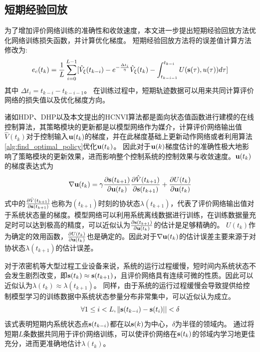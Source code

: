 \subsection{短期经验回放}
为了增加评价网络训练的准确性和收敛速度，本文进一步提出短期经验回放方法优化网络训练损失函数，并计算优化梯度。
短期经验回放方法将的误差值计算方法修改为:
\begin{equation}
  e_{c }(t_k)=\frac{1}{L}\sum_{i=0}^{L-1}[\hat{V}_{\xi}(t_{k-i})-e^{-\frac{\Delta t_i}{\eta}} \hat{V}_{\xi}(t_k)-\int_{t_{k-i-1}}^{t_{k-i}}U(\mathbf s(\tau), u(\tau))d \tau]
  \label{equ:TDerror_replay}
  \end{equation}
  其中 $\Delta t_i = t_{k-i}-t_{k-i-1}$。
在训练过程中，短期轨迹数据可以用来共同计算评价网络的损失值以及优化梯度方向。

诸如HDP、DHP以及本文提出的HCNVI算法都是面向状态值函数进行建模的在线控制算法，其策略模块的更新都是以模型网络作为媒介，计算评价网络输出值$\hat{V}(t_k)$对于控制输入${\mathbf
u}(t_k)$的梯度，并在此梯度基础上更新动作网络或者利用算法\ref{alg:find_optimal_policy}优化${\mathbf u}(t_k)$。
因此对于${\mathbf u}(k)$梯度估计的准确性极大地影响了策略模块的更新效果，进而影响整个控制系统的控制效果与收敛速度。${\mathbf u}(t_k)$的梯度表达式为
\begin{equation}
\label{equ:uk_grad} \nabla \mathbf u(t_k)=\gamma\frac{\partial \mathbf s(t_{k+1})}{\partial \mathbf u(t_k)}\frac{\partial\hat{V}(t_{k+1})}{\partial \mathbf s(t_{k+1})}+\frac{\partial U(t_k)}{\partial \mathbf u(t_k)}
\end{equation}
式中的$\frac{\partial\hat{V}(t_{k+1})}{\partial \mathbf
s(t_{k+1})}$也称为$(t_{k+1})$时刻的协状态$\lambda(t_{k+1})$，代表了评价网络输出值对于系统状态量的梯度。模型网络可以利用系统离线数据进行训练，在训练数据量充足时可以达到极高的精度，可以近似认为$\frac{\partial
\mathbf s(t_{k+1})}{\partial \mathbf u(t_k)}$的估计是足够精确的。
$U(t_k)$作为确定的效用函数，$\frac{\partial U(t_k)}{\partial \mathbf
u(t_k)}$也是确定的。因此对于$\nabla \mathbf
u(t_k)$的估计误差主要来源于对协状态$\lambda(t_{k+1})$的估计误差。

对于浓密机等大型过程工业设备来说，系统的运行过程缓慢，短时间内系统状态不会发生剧烈改变，即$\mathbf s(t_k)\approx \mathbf s(t_{k+1})$，且评价网络具有连续可微的性质。因此可以近似认为$\lambda(t_k)\approx \lambda(t_{k+1})$。
同样，由于系统的运行过程缓慢会导致提供给控制模型学习的训练数据中系统状态参量分布非常集中，可以近似认为成立。
\begin{equation}
\label{equ:x_equation} \forall 1 \leq i<L, \| \mathbf s(t_{k-i})-\mathbf s(t_i)||<\delta
\end{equation}
该式表明短期内系统状态点$\mathbf s(t_{k-i})$都在以$\mathbf s(k)$为中心，$\delta$为半径的领域内。
通过将短期$L$条数据共同用于评价网络训练，可以使评价网络在$\mathbf s(t_k)$的邻域内学习地更佳充分，进而更准确地估计$\lambda(t_k)$。

